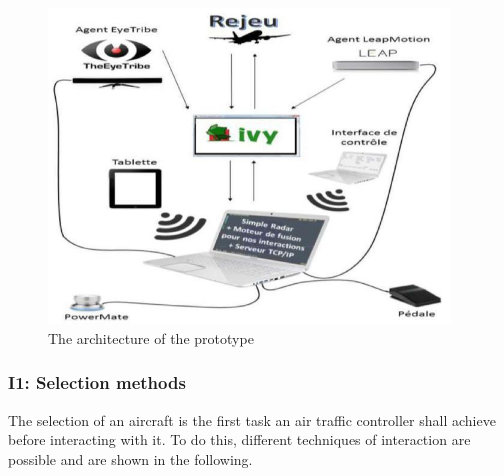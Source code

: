  \begin{figure}
 \centering
	\includegraphics[width=0.95\textwidth]{Figures/prototype.png}
	\caption{ The architecture of the prototype}
	\label{e:prototype}
\end{figure}

\subsubsection{I1: Selection methods}
The selection of an aircraft is the first task an air traffic
controller shall achieve before interacting with it. To do this, different techniques of
interaction are possible and are shown in the following.

